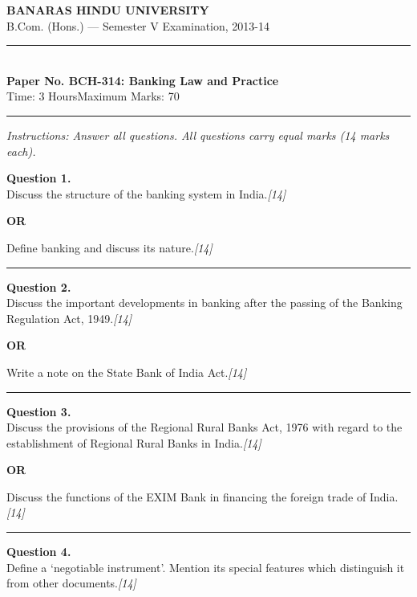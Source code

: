 \documentclass[11pt,a4paper]{article}
\newcommand{\pts}[1]{\hfill   \textit{[#1]}}
\begin{document}
\begin{center}
  {\large\bfseries BANARAS HINDU UNIVERSITY}\\[2pt]
  {\normalsize B.Com. (Hons.) --- Semester V Examination, 2013-14}\\[6pt]
  \rule{0.8\linewidth}{0.5pt}\\[6pt]
  {\large\bfseries Paper No. BCH-314: Banking Law and Practice}\\[4pt]
  {\normalsize Time: 3 Hours\hfill Maximum Marks: 70}
\end{center}

\rule{\linewidth}{0.4pt}

\smallskip



\noindent   \textit{Instructions: Answer all questions. All questions carry equal marks (14 marks each).}

\bigskip




\noindent   \textbf{Question 1.} \\
Discuss the structure of the banking system in India.\pts{14}

\centerline{   \textbf{OR}}

Define banking and discuss its nature.\pts{14}

\medskip\rule{\linewidth}{0.2pt}




\noindent   \textbf{Question 2.} \\
Discuss the important developments in banking after the passing of the Banking Regulation Act, 1949.\pts{14}

\centerline{   \textbf{OR}}

Write a note on the State Bank of India Act.\pts{14}

\medskip\rule{\linewidth}{0.2pt}

\pagebreak




\noindent   \textbf{Question 3.} \\
Discuss the provisions of the Regional Rural Banks Act, 1976 with regard to the establishment of Regional Rural Banks in India.\pts{14}

\centerline{   \textbf{OR}}

Discuss the functions of the EXIM Bank in financing the foreign trade of India.\pts{14}

\medskip\rule{\linewidth}{0.2pt}




\noindent   \textbf{Question 4.} \\
Define a `negotiable instrument'. Mention its special features which distinguish it from other documents.\pts{14}
\end{document}
